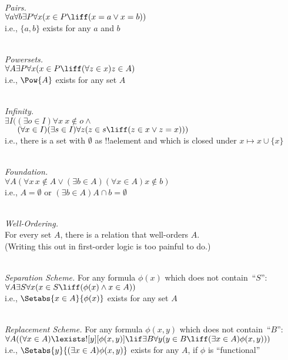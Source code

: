 \
\\\emph{Pairs.} 
\\$\forall a \forall b \exists P \forall x (x \in P \liff (x = a \lor x = b))$
\\i.e., $\{a, b\}$ exists for any $a$ and $b$

\
\\\emph{Powersets.}
\\$\forall A \exists P \forall x(x \in P \liff (\forall z \in x)z \in A)$
\\i.e., $\Pow{A}$ exists for any set $A$

\
\\\emph{Infinity.} 	
\\$\exists I((\exists o \in I)\forall x\ x \notin o \land {}$
\\$\phantom{\exists I(}(\forall x \in I)(\exists s \in I)\forall z(z \in s \liff (z \in x \lor z = x)))$
\\i.e., there is a set with $\emptyset$ as !!a{element} and which 
is closed under $x \mapsto x \cup \{x\}$

\
\\\emph{Foundation.}
\\$\forall A(\forall x\, x \notin A \lor (\exists b \in A)(\forall x \in A)x \notin b)$
\\i.e., $A = \emptyset$ or $(\exists b \in A)A\cap b = \emptyset$

\
\\\emph{Well-Ordering.} 
\\For every set $A$, there is a relation that well-orders $A$.
\\(Writing this out in first-order logic is too painful to do.)

\
\\\emph{Separation Scheme.} For any formula $\phi(x)$ which does not contain~``$S$'':
\\$\forall A \exists S \forall x(x \in S \liff (\phi(x) \land x \in A))$
\\i.e., $\Setabs{x \in A}{\phi(x)}$ exists for any set $A$

\
\\\emph{Replacement Scheme.} For any formula $\phi(x, y)$ which does not contain~``$B$'':
\\$\forall A((\forall x \in A)\lexists![y][\phi(x,y)] \lif \exists B \forall y (y \in B \liff (\exists x \in A)\phi(x,y)))$
\\i.e., $\Setabs{y}{(\exists x \in A)\phi(x,y)}$ exists for any $A$, if $\phi$ is ``functional''

